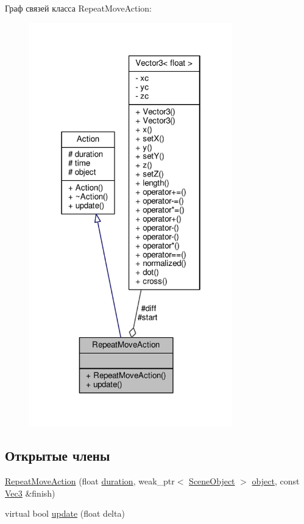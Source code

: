 Граф связей класса Repeat\+Move\+Action\+:
\nopagebreak
\begin{figure}[H]
\begin{center}
\leavevmode
\includegraphics[width=250pt]{d6/d16/class_repeat_move_action__coll__graph}
\end{center}
\end{figure}
\subsection*{Открытые члены}
\begin{DoxyCompactItemize}
\item 
\hyperlink{class_repeat_move_action_a8717501294f842084a88cb228b4d3687}{Repeat\+Move\+Action} (float \hyperlink{class_action_af26e528eec8ae24e9dfc1ab9d6e809a7}{duration}, weak\+\_\+ptr$<$ \hyperlink{class_scene_object}{Scene\+Object} $>$ \hyperlink{class_action_a1dfd6b0f501cce2b19d076b7d6b5aec8}{object}, const \hyperlink{vec3_8h_a221ad8ea4d9be4111628ee1ca22ee3ba}{Vec3} \&finish)
\item 
virtual bool \hyperlink{class_repeat_move_action_ad2a08b798e2c0ae093d1ae358c8ec3c2}{update} (float delta)
\end{DoxyCompactItemize}

